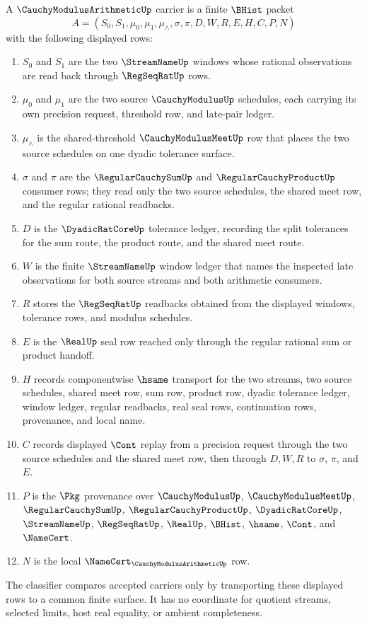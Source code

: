 \begin{definition}
\label{def:cauchy-modulus-arithmetic-carrier}
A $\CauchyModulusArithmeticUp$ carrier is a finite $\BHist$ packet
$$
A=(S_0,S_1,\mu_0,\mu_1,\mu_{\wedge},\sigma,\pi,D,W,R,E,H,C,P,N)
$$
with the following displayed rows:
\begin{enumerate}
\item $S_0$ and $S_1$ are the two $\StreamNameUp$ windows whose rational
observations are read back through $\RegSeqRatUp$ rows.
\item $\mu_0$ and $\mu_1$ are the two source $\CauchyModulusUp$ schedules,
each carrying its own precision request, threshold row, and late-pair ledger.
\item $\mu_{\wedge}$ is the shared-threshold $\CauchyModulusMeetUp$ row that
places the two source schedules on one dyadic tolerance surface.
\item $\sigma$ and $\pi$ are the $\RegularCauchySumUp$ and
$\RegularCauchyProductUp$ consumer rows; they read only the two source
schedules, the shared meet row, and the regular rational readbacks.
\item $D$ is the $\DyadicRatCoreUp$ tolerance ledger, recording the split
tolerances for the sum route, the product route, and the shared meet route.
\item $W$ is the finite $\StreamNameUp$ window ledger that names the inspected
late observations for both source streams and both arithmetic consumers.
\item $R$ stores the $\RegSeqRatUp$ readbacks obtained from the displayed
windows, tolerance rows, and modulus schedules.
\item $E$ is the $\RealUp$ seal row reached only through the regular rational
sum or product handoff.
\item $H$ records componentwise $\hsame$ transport for the two streams, two
source schedules, shared meet row, sum row, product row, dyadic tolerance
ledger, window ledger, regular readbacks, real seal rows, continuation rows,
provenance, and local name.
\item $C$ records displayed $\Cont$ replay from a precision request through
the two source schedules and the shared meet row, then through $D,W,R$ to
$\sigma$, $\pi$, and $E$.
\item $P$ is the $\Pkg$ provenance over $\CauchyModulusUp$,
$\CauchyModulusMeetUp$, $\RegularCauchySumUp$,
$\RegularCauchyProductUp$, $\DyadicRatCoreUp$, $\StreamNameUp$,
$\RegSeqRatUp$, $\RealUp$, $\BHist$, $\hsame$, $\Cont$, and $\NameCert$.
\item $N$ is the local $\NameCert_{\CauchyModulusArithmeticUp}$ row.
\end{enumerate}
The classifier compares accepted carriers only by transporting these displayed
rows to a common finite surface. It has no coordinate for quotient streams,
selected limits, host real equality, or ambient completeness.
\end{definition}


